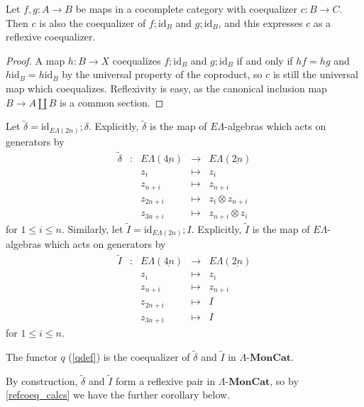 \documentclass{amsbook} %
\newcommand{\mb}{\mathbf}
\newcommand{\id}{\textrm{id}}
\newcommand{\ELAlg}{\lmc}
\newcommand{\ELnn}{E\Lambda(\underline{2n})}
\newcommand{\ELnnnn}{E\Lambda(\underline{4n})}
\newcommand{\lmc}{\Lambda\mbox{-}\mb{MonCat}}
\numberwithin{section}{chapter}
\begin{document}
\begin{lem}\label{sum_coeq}
Let $f, g: A \to B$ be maps in a cocomplete category with coequalizer $c: B \to C$. Then $c$ is also the coequalizer of $f;\id_B$ and $g; \id_B$, and this expresses $c$ as a reflexive coequalizer.
\end{lem}
\begin{proof}
A map $h: B \to X$ coequalizes $f;\id_B$ and $g; \id_B$ if and only if $hf = hg$ and $h \id_B = h \id_B$ by the universal property of the coproduct, so $c$ is still the universal map which coequalizes. Reflexivity is easy, as the canonical inclusion map $B \to A \coprod B$ is a common section.

\end{proof}

\begin{Defi} \label{coprodmapdef} Let $\tilde{\delta} = \mathrm{id}_{\ELnn};\delta$.
Explicitly, $\tilde{\delta}$ is the map of $E\Lambda$-algebras which acts on generators by
\[ \begin{array}{rlrlll}
			\tilde{\delta} & : & \ELnnnn & \to & \ELnn \\
			&  & z_i & \mapsto & z_i  \\
			&  & z_{n+i} & \mapsto & z_{n+i} \\
			&  & z_{2n+i} & \mapsto & z_i \otimes z_{n+i} \\
			&  & z_{3n+i} & \mapsto & z_{n+i} \otimes z_i			
		\end{array}
\]
for $1 \le i \le n$. Similarly, let $\tilde{I} = \mathrm{id}_{\ELnn};I$.
Explicitly, $\tilde{I}$ is the map of $E\Lambda$-algebras which acts on generators by
\[ \begin{array}{rlrlll}
			\tilde{I} & : & \ELnnnn & \to & \ELnn \\
			&  & z_i & \mapsto & z_i  \\
			& & z_{n+i} & \mapsto & z_{n+i} \\
			& & z_{2n+i} & \mapsto & I \\
			&  & z_{3n+i} & \mapsto & I
		\end{array} 
\]
for $1 \le i \le n$. 
\end{Defi}



\begin{cor}\label{q_other_coeq} The functor $q$ (\cref{qdef}) is the coequalizer of $\tilde{\delta}$ and $\tilde{I}$ in $\ELAlg$.
\end{cor}

By construction, $\tilde{\delta}$ and $\tilde{I}$ form a reflexive pair in $\ELAlg$, so by \cref{refcoeq_calcs} we have the further corollary below.
\end{document}
